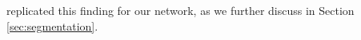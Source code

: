 replicated this finding for our network, as we further discuss in
Section \ref{sec:segmentation}.


